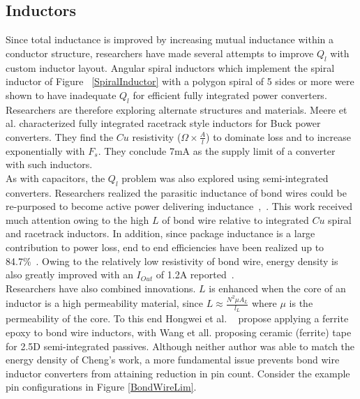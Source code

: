 \documentclass[letterpaper,twocolumn,10pt]{article}
\begin{document}
\subsection{Inductors }Since total inductance is improved by increasing mutual inductance within a conductor structure, researchers have made several attempts to improve $Q_l$ with custom inductor layout. Angular spiral inductors which implement the spiral inductor of Figure ~\ref{SpiralInductor} with a polygon spiral of 5 sides or more were shown to have inadequate $Q_l$ for efficient fully integrated power converters\cite{Alimadadi2008}\cite{Artillan2011}. Researchers are therefore exploring alternate structures and materials. Meere et al. \cite{Meere2009} characterized fully integrated racetrack style inductors for Buck power converters. They find the $Cu$ resistivity ($\Omega \times \frac{A}{l}$) to dominate loss and to increase exponentially with $F_s$. They conclude 7mA as the supply limit of a converter with such inductors.\\
As with capacitors, the $Q_l$ problem was also explored using semi-integrated converters. Researchers realized the parasitic inductance of bond wires could be re-purposed to become active power delivering inductance~\cite{Wens2007},~\cite{Ahn2012}. This work received much attention owing to the high $L$ of bond wire relative to integrated $Cu$ spiral and racetrack inductors. In addition, since package inductance is a large contribution to power loss, end to end efficiencies have been realized up to 84.7\%~\cite{Cheng2013}. Owing to the relatively low resistivity of bond wire, energy density is also greatly improved with an $I_{Out}$ of 1.2A reported~\cite{Cheng2013}.\\
\indent Researchers have also combined innovations. $L$ is enhanced when the core of an inductor is a high permeability material, since $L \approx \frac{N^2\mu A_L}{l_L}$ where $\mu$ is the permeability of the core. To this end Hongwei et al. ~\cite{Hongwei2011} propose applying a ferrite epoxy to bond wire inductors, with Wang et all. proposing ceramic (ferrite) tape for 2.5D semi-integrated passives. Although neither author was able to match the energy density of Cheng's work, a more fundamental issue prevents bond wire inductor converters from attaining reduction in pin count. Consider the example pin configurations in Figure \ref{BondWireLim}.
    
\end{document}
